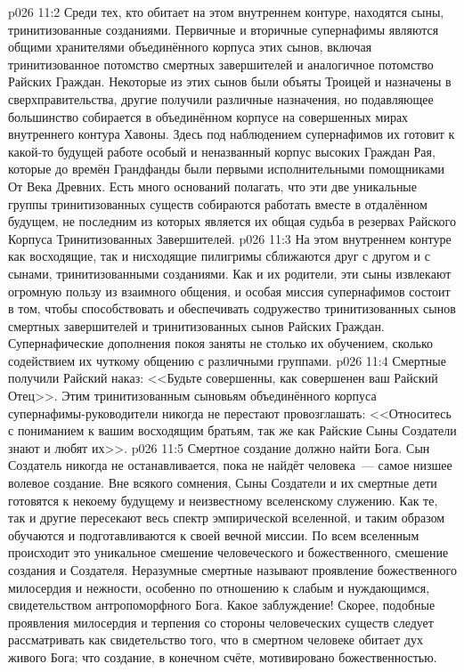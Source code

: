 \vs p026 11:2 \pc Среди тех, кто обитает на этом внутреннем контуре, находятся сыны, тринитизованные созданиями. Первичные и вторичные супернафимы являются общими хранителями объединённого корпуса этих сынов, включая тринитизованное потомство смертных завершителей и аналогичное потомство Райских Граждан. Некоторые из этих сынов были объяты Троицей и назначены в сверхправительства, другие получили различные назначения, но подавляющее большинство собирается в объединённом корпусе на совершенных мирах внутреннего контура Хавоны. Здесь под наблюдением супернафимов их готовит к какой\hyp{}то будущей работе особый и неназванный корпус высоких Граждан Рая, которые до времён Грандфанды были первыми исполнительными помощниками От Века Древних. Есть много оснований полагать, что эти две уникальные группы тринитизованных существ собираются работать вместе в отдалённом будущем, не последним из которых является их общая судьба в резервах Райского Корпуса Тринитизованных Завершителей.
\vs p026 11:3 На этом внутреннем контуре как восходящие, так и нисходящие пилигримы сближаются друг с другом и с сынами, тринитизованными созданиями. Как и их родители, эти сыны извлекают огромную пользу из взаимного общения, и особая миссия супернафимов состоит в том, чтобы способствовать и обеспечивать содружество тринитизованных сынов смертных завершителей и тринитизованных сынов Райских Граждан. Супернафические дополнения покоя заняты не столько их обучением, сколько содействием их чуткому общению с различными группами.
\vs p026 11:4 Смертные получили Райский наказ: <<Будьте совершенны, как совершенен ваш Райский Отец>>. Этим тринитизованным сыновьям объединённого корпуса супернафимы\hyp{}руководители никогда не перестают провозглашать: <<Относитесь с пониманием к вашим восходящим братьям, так же как Райские Сыны Создатели знают и любят их>>.
\vs p026 11:5 \pc Смертное создание должно найти Бога. Сын Создатель никогда не останавливается, пока не найдёт человека~--- самое низшее волевое создание. Вне всякого сомнения, Сыны Создатели и их смертные дети готовятся к некоему будущему и неизвестному вселенскому служению. Как те, так и другие пересекают весь спектр эмпирической вселенной, и таким образом обучаются и подготавливаются к своей вечной миссии. По всем вселенным происходит это уникальное смешение человеческого и божественного, смешение создания и Создателя. Неразумные смертные называют проявление божественного милосердия и нежности, особенно по отношению к слабым и нуждающимся, свидетельством антропоморфного Бога. Какое заблуждение! Скорее, подобные проявления милосердия и терпения со стороны человеческих существ следует рассматривать как свидетельство того, что в смертном человеке обитает дух живого Бога; что создание, в конечном счёте, мотивировано божественностью.
